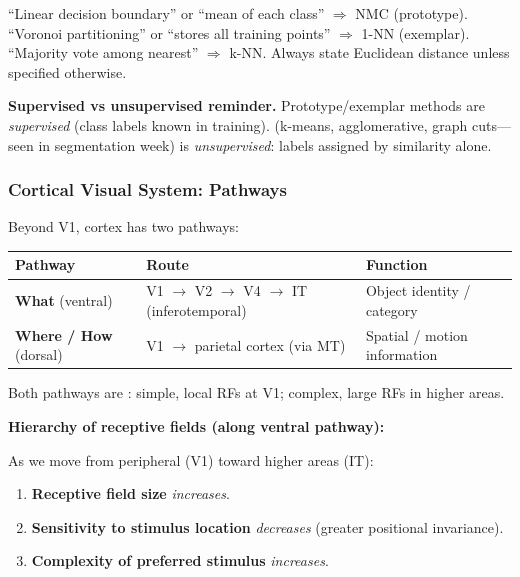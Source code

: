 \begin{tipbox}
``Linear decision boundary'' or ``mean of each class'' $\Rightarrow$ NMC (prototype). ``Voronoi partitioning'' or ``stores all training points'' $\Rightarrow$ 1-NN (exemplar). ``Majority vote among nearest'' $\Rightarrow$ k-NN. Always state Euclidean distance unless specified otherwise.
\end{tipbox}

\textbf{Supervised vs unsupervised reminder.} Prototype/exemplar methods are \emph{supervised} (class labels known in training).  (k-means, agglomerative, graph cuts---seen in segmentation week) is \emph{unsupervised}: labels assigned by similarity alone.

\bigseparator

\subsubsection{Cortical Visual System: Pathways}

Beyond V1, cortex has two pathways:

\begin{center}
\renewcommand{\arraystretch}{1.3}
\begin{tabular}{@{} l l l @{}}
\toprule
\textbf{Pathway} & \textbf{Route} & \textbf{Function} \\
\midrule
\textbf{What} (ventral)   & V1 $\rightarrow$ V2 $\rightarrow$ V4 $\rightarrow$ IT (inferotemporal) & Object identity / category \\
\textbf{Where / How} (dorsal) & V1 $\rightarrow$ parietal cortex (via MT) & Spatial / motion information \\
\bottomrule
\end{tabular}
\end{center}

Both pathways are : simple, local RFs at V1; complex, large RFs in higher areas.

\separator

\textbf{Hierarchy of receptive fields (along ventral pathway):}

\begin{thmbox}
As we move from peripheral (V1) toward higher areas (IT):
\begin{enumerate}
  \item \textbf{Receptive field size} \emph{increases}.
  \item \textbf{Sensitivity to stimulus location} \emph{decreases} (greater positional invariance).
  \item \textbf{Complexity of preferred stimulus} \emph{increases}.
\end{enumerate}
\end{thmbox}

